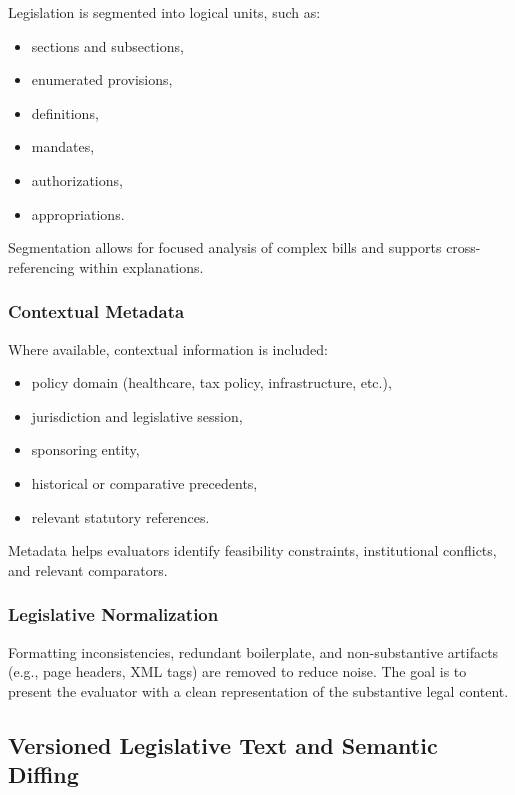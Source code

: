 \documentclass[12pt]{article}
\begin{document}
Legislation is segmented into logical units, such as:

\begin{itemize}
    \item sections and subsections,
    \item enumerated provisions,
    \item definitions,
    \item mandates,
    \item authorizations,
    \item appropriations.
\end{itemize}

Segmentation allows for focused analysis of complex bills and supports cross-referencing within explanations.

\subsubsection{Contextual Metadata}

Where available, contextual information is included:

\begin{itemize}
    \item policy domain (healthcare, tax policy, infrastructure, etc.),
    \item jurisdiction and legislative session,
    \item sponsoring entity,
    \item historical or comparative precedents,
    \item relevant statutory references.
\end{itemize}

Metadata helps evaluators identify feasibility constraints, institutional conflicts, and relevant comparators.

\subsubsection{Legislative Normalization}

Formatting inconsistencies, redundant boilerplate, and non-substantive artifacts (e.g., page headers, XML tags) are
removed to reduce noise. The goal is to present the evaluator with a clean representation of the substantive legal
content.

\subsection{Versioned Legislative Text and Semantic Diffing}
\end{document}
